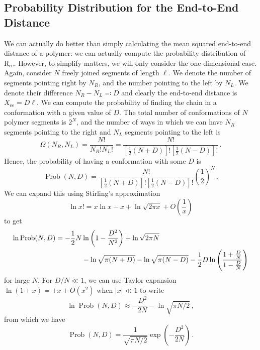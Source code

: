 \documentclass{article}
\theoremstyle{plain}\theoremheaderfont{\normalfont\bfseries}\theorembodyfont{\rmfamily}\theoremseparator{.}\newtheorem*{thm}{Theorem}\newtheorem*{law}{Law}\newtheorem*{pos}{Postulate}
\numberwithin{equation}{section}
\newcommand{\vb}[1]{\bm{\mathrm{#1}}}
\newcommand{\abs}[1]{\left| #1 \right|}
\DeclareMathOperator{\Prob}{Prob}
\begin{document}
    \subsection{Probability Distribution for the End-to-End Distance}
    We can actually do better than simply calculating the mean squared end-to-end distance of a polymer: we can actually compute the probability distribution of \(\vb{R}_{\text{ee}}\). However, to simplify matters, we will only consider the one-dimensional case. Again, consider \(N\) freely joined segments of length \(\ell\). We denote the number of segments pointing right by \(N_R\), and the number pointing to the left by \(N_L\). We denote their difference \(N_R-N_L\eqqcolon D\) and clearly the end-to-end distance is \(X_{\text{ee}}=D\ell\). We can compute the probability of finding the chain in a conformation with a given value of \(D\). The total number of conformations of \(N\) polymer segments is \(2^N\), and the number of ways in which we can have \(N_R\) segments pointing to the right and \(N_L\) segments pointing to the left is
    \begin{equation}
        \Omega(N_R,N_L)=\frac{N!}{N_R!N_L!}=\frac{N!}{[\frac{1}{2}(N+D)]![\frac{1}{2}(N-D)]!}\,.
    \end{equation}
    Hence, the probability of having a conformation with some \(D\) is
    \begin{equation}
        \Prob(N,D)=\frac{N!}{[\frac{1}{2}(N+D)]![\frac{1}{2}(N-D)]!}\left(\frac{1}{2}\right)^N\,.
    \end{equation}
    We can expand this using Stirling's approximation
    \begin{equation}
        \ln x!=x\ln x-x+\ln\sqrt{2\pi x}+O\left(\frac{1}{x}\right)
    \end{equation}
    to get
    \begin{align}
        \ln \Prob(N,D)=-\frac{1}{2}N&\ln\left(1-\frac{D^2}{N^2}\right)+\ln\sqrt{2\pi N}\notag\\
        &-\ln\sqrt{\pi(N+D)}-\ln\sqrt{\pi(N-D)}-\frac{1}{2}D\ln\left(\frac{1+\frac{D}{N}}{1-\frac{D}{N}}\right)
    \end{align}
    for large \(N\). For \(D/N\ll 1\), we can use Taylor expansion \(\ln(1\pm x)=\pm x+O(x^2)\) when \(\abs{x}\ll 1\) to write
    \begin{equation}
        \ln\Prob(N,D)\approx -\frac{D^2}{2N}-\ln\sqrt{\pi N/2}\,,
    \end{equation}
    from which we have
    \begin{equation}
        \Prob(N,D)=\frac{1}{\sqrt{\pi N/2}}\exp\left(-\frac{D^2}{2N}\right)\,.
    \end{equation}
\end{document}
